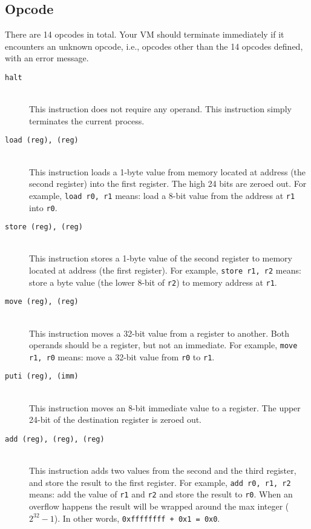 \documentclass[a4paper, 11pt]{article}
\theoremstyle{definition}
\begin{document}
{\subsection{Opcode}

There are 14 opcodes in total. Your VM should terminate immediately if
it encounters an unknown opcode, i.e., opcodes other than the 14
opcodes defined, with an error message.

\begin{description}

  \item [\texttt{halt}]~\\
    This instruction does not require any operand. This instruction
    simply terminates the current process.

  \item [\texttt{load (reg), (reg)}]~\\
    This instruction loads a 1-byte value from memory located at
    address (the second register) into the first register. The high 24
    bits are zeroed out. For example, \texttt{load r0, r1} means: load
    a 8-bit value from the address at \texttt{r1} into \texttt{r0}.

  \item [\texttt{store (reg), (reg)}]~\\
    This instruction stores a 1-byte value of the second register to
    memory located at address (the first register). For example,
    \texttt{store r1, r2} means: store a byte value (the lower 8-bit
    of \texttt{r2}) to memory address at \texttt{r1}.

  \item [\texttt{move (reg), (reg)}]~\\
    This instruction moves a 32-bit value from a register to another.
    Both operands should be a register, but not an immediate. For
    example, \texttt{move r1, r0} means: move a 32-bit value from
    \texttt{r0} to \texttt{r1}.

  \item [\texttt{puti (reg), (imm)}]~\\
    This instruction moves an 8-bit immediate value to a register. The
    upper 24-bit of the destination register is zeroed out.

  \item [\texttt{add (reg), (reg), (reg)}]~\\
    This instruction adds two values from the second and the third
    register, and store the result to the first register. For example,
    \texttt{add r0, r1, r2} means: add the value of \texttt{r1} and
    \texttt{r2} and store the result to \texttt{r0}. When an overflow
    happens the result will be wrapped around the max integer
    ($2^{32}-1$). In other words, \texttt{0xffffffff + 0x1 = 0x0}.


\end{description}}
\end{document}

